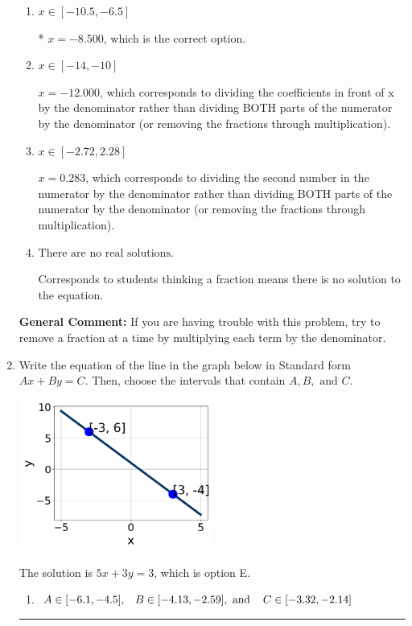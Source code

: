 \documentclass{extbook}[14pt]
\newcommand{\litem}[1]{\item #1

\rule{\textwidth}{0.4pt}}
\begin{document}
\begin{enumerate}
{\begin{enumerate}[label=\Alph*.]
 $x = -22.500$, which corresponds to not distributing the negative in front of the second fraction.
\item \( x \in [-10.5, -6.5] \)

* $x = -8.500$, which is the correct option.
\item \( x \in [-14, -10] \)

 $x = -12.000$, which corresponds to dividing the coefficients in front of x by the denominator rather than dividing BOTH parts of the numerator by the denominator (or removing the fractions through multiplication).
\item \( x \in [-2.72, 2.28] \)

 $x = 0.283$, which corresponds to dividing the second number in the numerator by the denominator rather than dividing BOTH parts of the numerator by the denominator (or removing the fractions through multiplication).
\item \( \text{There are no real solutions.} \)

Corresponds to students thinking a fraction means there is no solution to the equation.
\end{enumerate}

\textbf{General Comment:} If you are having trouble with this problem, try to remove a fraction at a time by multiplying each term by the denominator.
}
\litem{
Write the equation of the line in the graph below in Standard form $Ax+By=C$. Then, choose the intervals that contain $A, B, \text{ and } C$.

\begin{center}
    \includegraphics[width=0.5\textwidth]{../Figures/linearGraphToStandardC.png}
\end{center}



The solution is \( 5x + 3y = 3 \), which is option E.\begin{enumerate}[label=\Alph*.]
\item \( A \in [-6.1, -4.5], \hspace{3mm} B \in [-4.13, -2.59], \text{ and } \hspace{3mm} C \in [-3.32, -2.14] \)


\end{enumerate}}
\end{enumerate}
\end{document}
